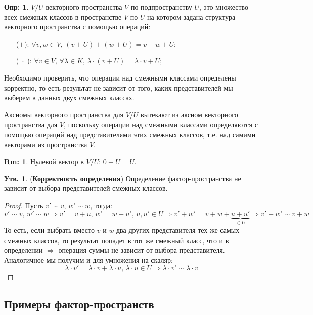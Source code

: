 \documentclass[12pt]{article}
\theoremstyle{definition}
\newtheorem{defn}{Опр:}
\newtheorem{rem}{Rm:}
\newtheorem{prop}{Утв.}
\begin{document}
\begin{defn}
	 $V /U$ векторного пространства $V$ по подпространству $U$, это множество всех смежных классов в пространстве $V$ по $U$ на котором задана структура векторного пространства с помощью операций:
	\begin{enumerate}
		\item[($+$):] $\forall v,w \in V, \, (v + U) + (w + U) = v + w + U$;
		\item[($\; \cdot \; $):] $\forall v \in V, \, \forall \lambda \in K, \, \lambda{\cdot}(v + U) = \lambda{\cdot}v + U$;
	\end{enumerate}
\end{defn}
Необходимо проверить, что операции над смежными классами определены корректно, то есть результат не зависит от того, каких представителей мы выберем в данных двух смежных классах.

Аксиомы векторного пространства для $V/U$ вытекают из аксиом векторного пространства для $V$, поскольку операции над смежными классами определяются с помощью операций над представителями этих смежных классов, т.е. над самими векторами из пространства $V$.

\begin{rem}
	Нулевой вектор в $V/U$: $0 + U = U$.
\end{rem}

\newpage
\begin{prop}(\textbf{Корректность определения})
	Определение фактор-пространства не зависит от выбора представителей смежных классов.
\end{prop}
\begin{proof}
	Пусть $v' \sim v, \, w' \sim w$, тогда:
	$$
		v' \sim v, \, w' \sim w \Rightarrow v' = v + u, \, w' = w + u', \, u,u' \in U \Rightarrow v' + w' = v + w + \underbrace{u + u'}_{\in U} \Rightarrow v' + w' \sim v + w
	$$
	То есть, если выбрать вместо $v$ и $w$ два других представителя тех же самых смежных классов, то результат попадет в тот же смежный класс, что и в определении $\Rightarrow$ операция суммы не зависит от выбора представителя. Аналогичное мы получим и для умножения на скаляр:
	$$
		\lambda{\cdot}v' = \lambda {\cdot}v + \lambda{\cdot}u, \, \lambda{\cdot}u \in U \Rightarrow \lambda{\cdot}v' \sim \lambda{\cdot}v
	$$
\end{proof}

\subsection*{Примеры фактор-пространств}
\end{document}
